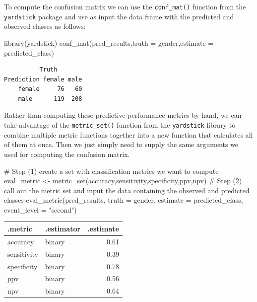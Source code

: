 \documentclass[
  letterpaper,
  DIV=11,
  numbers=noendperiod]{scrartcl}
\newenvironment{Shaded}{\begin{snugshade}}{\end{snugshade}}
\newcommand{\AttributeTok}[1]{\textcolor[rgb]{0.40,0.45,0.13}{#1}}
\newcommand{\CommentTok}[1]{\textcolor[rgb]{0.37,0.37,0.37}{#1}}
\newcommand{\FunctionTok}[1]{\textcolor[rgb]{0.28,0.35,0.67}{#1}}
\newcommand{\NormalTok}[1]{\textcolor[rgb]{0.00,0.23,0.31}{#1}}
\newcommand{\OtherTok}[1]{\textcolor[rgb]{0.00,0.23,0.31}{#1}}
\newcommand{\StringTok}[1]{\textcolor[rgb]{0.13,0.47,0.30}{#1}}
\begin{document}
To compute the confusion matrix we can use the \texttt{conf\_mat()}
function from the \texttt{yardstick} package and use as input the data
frame with the predicted and observed classes as follows:

\begin{Shaded}
\begin{Highlighting}[]
\FunctionTok{library}\NormalTok{(yardstick)}
\FunctionTok{conf\_mat}\NormalTok{(pred\_results,}\AttributeTok{truth =}\NormalTok{ gender,}\AttributeTok{estimate =}\NormalTok{ predicted\_class)}
\end{Highlighting}
\end{Shaded}

\begin{verbatim}
          Truth
Prediction female male
    female     76   60
    male      119  208
\end{verbatim}

Rather than computing these predictive performance metrics by hand, we
can take advantage of the \texttt{metric\_set()} function from the
\texttt{yardstick} library to combine multiple metric functions together
into a new function that calculates all of them at once. Then we just
simply need to supply the same arguments we used for computing the
confusion matrix.

\begin{Shaded}
\begin{Highlighting}[]
\CommentTok{\# Step (1) create a set with classification metrics we want to compute}
\NormalTok{eval\_metric }\OtherTok{\textless{}{-}} \FunctionTok{metric\_set}\NormalTok{(accuracy,sensitivity,specificity,ppv,npv)}
\CommentTok{\# Step (2) call out the metric set and input the data containing the observed and predicted classes}
\FunctionTok{eval\_metric}\NormalTok{(pred\_results,}
            \AttributeTok{truth =}\NormalTok{ gender,}
            \AttributeTok{estimate =}\NormalTok{ predicted\_class,  }
            \AttributeTok{event\_level =} \StringTok{"second"}\NormalTok{) }
\end{Highlighting}
\end{Shaded}

\begin{longtable}[]{@{}llr@{}}
\toprule\noalign{}
.metric & .estimator & .estimate \\
\midrule\noalign{}
\endhead
\bottomrule\noalign{}
\endlastfoot
accuracy & binary & 0.61 \\
sensitivity & binary & 0.39 \\
specificity & binary & 0.78 \\
ppv & binary & 0.56 \\
npv & binary & 0.64 \\
\end{longtable}
\end{document}

